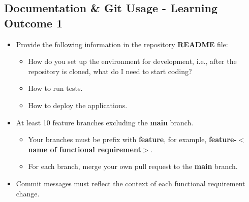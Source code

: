 \documentclass{article}
\begin{document}
\subsection*{Documentation \& Git Usage - Learning Outcome 1}
\begin{itemize}
    \item Provide the following information in the repository \textbf{README} file:
    \begin{itemize}
		\item How do you set up the environment for development, i.e., after the repository is cloned, what do I need to start coding?
		\item How to run tests.
		\item How to deploy the applications.
    \end{itemize}
    \item At least 10 feature branches excluding the \textbf{main} branch.
    \begin{itemize}
        \item Your branches must be prefix with \textbf{feature}, for example, \textbf{feature-$<$name of functional requirement$>$}.
        \item For each branch, merge your own pull request to the \textbf{main} branch.
    \end{itemize}
    \item Commit messages must reflect the context of each functional requirement change.
\end{itemize}
\end{document}
